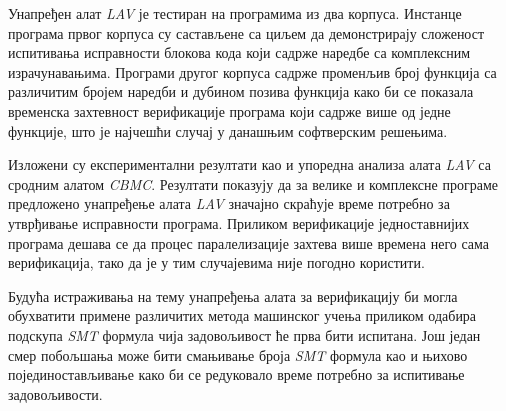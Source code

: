 \documentclass[12pt,oneside]{memoir}
\begin{document}
Унапређен алат \textit{LAV} је тестиран на програмима из два корпуса. Инстанце програма првог корпуса су састављене са циљем да демонстрирају сложеност испитивања исправности блокова кода који садрже наредбе са комплексним израчунавањима. Програми другог корпуса садрже променљив број функција са различитим бројем наредби и дубином позива функција како би се показала временска захтевност верификације програма који садрже више од једне функције, што је најчешћи случај у данашњим софтверским решењима.

Изложени су експериментални резултати као и упоредна анализа алата \textit{LAV} са сродним алатом \textit{CBMC}. Резултати показују да за велике и комплексне програме предложено унапређење алата \textit{LAV} значајно скраћује време потребно за утврђивање исправности програма. Приликом верификације једноставнијих програма дешава се да процес паралелизације захтева више времена него сама верификација, тако да је у тим случајевима није погодно користити.

Будућа истраживања на тему унапређења алата за верификацију би могла обухватити примене различитих метода машинског учења приликом одабира подскупа \textit{SMT} формула чија задовољивост ће прва бити испитана. Још један смер побољшања може бити смањивање броја \textit{SMT} формула као и њихово појединостављивање како би се редуковало време потребно за испитивање задовољивости.


\literatura
\backmatter
\end{document}
